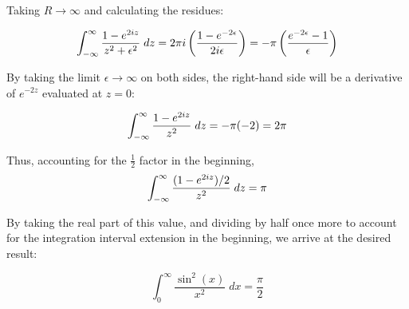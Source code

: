 \documentclass[12pt]{article}%
\newcommand{\Cep}{\mathcal{C}_\epsilon}
\newcommand{\CR}{\mathcal{C}_R}
\begin{document}
\begin{enumerate}
  Taking $R \rightarrow \infty$ and calculating the residues:

  \begin{align*}
    \int_{-\infty}^{\infty} \frac{1- e^{2iz}}{z^2 + \epsilon^2} \; dz = 2\pi i \left( \frac{1 - e^{-2\epsilon}}{2i\epsilon} \right) = -\pi \left( \frac{e^{-2\epsilon} - 1}{\epsilon}\right)
  \end{align*}

  By taking the limit $\epsilon \rightarrow \infty$ on both sides, the right-hand side will be a derivative of $e^{-2z}$ evaluated at $z = 0$:

  \[\int_{-\infty}^{\infty} \frac{1 - e^{2iz}}{z^2} \; dz  = - \pi (-2) = 2\pi\]

  Thus, accounting for the $\frac{1}{2}$ factor in the beginning,
\[ \int_{-\infty}^{\infty} \frac{(1- e^{2iz})/2}{z^2} \; dz = \pi\]

By taking the real part of this value, and dividing by half once more to account for the integration interval extension in the beginning, we arrive at the desired result:

\[ \int_{0}^\infty \frac{\sin^2(x)}{x^2} \; dx = \frac{\pi}{2} \]


\end{enumerate}
\end{document}
